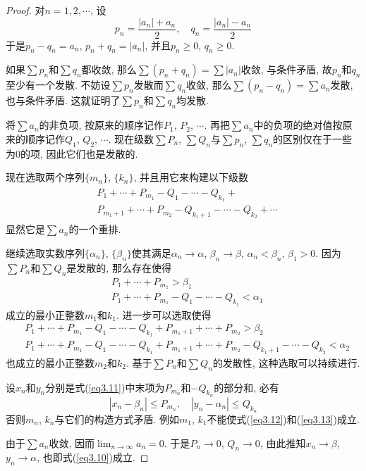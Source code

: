 \documentclass[cn,12pt,math=mtpro2,citestyle=gb7714-2015,bibstyle=gb7714-2015,twocol]{elegantbook}
\newcommand{\limn}{\lim_{n\to\infty}}
\begin{document}
\begin{proof}
  对$n=1,2,\cdots$, 设
  $$p_n=\frac{|a_n|+a_n}{2},\quad q_n=\frac{|a_n|-a_n}{2}$$
  于是$p_n-q_n=a_n$, $p_n+q_n=|a_n|$, 并且$p_n\geq 0$, $q_n\geq 0$.

  如果$\sum p_n$和$\sum q_n$都收敛, 那么$\sum (p_n+q_n)=\sum|a_n|$收敛, 与条件矛盾, 故$p_n$和$q_n$至少有一个发散. 不妨设$\sum p_n$发散而$\sum q_n$收敛, 那么$\sum (p_n-q_n)=\sum a_n$发散, 也与条件矛盾. 这就证明了$\sum p_n$和$\sum q_n$均发散.

  将$\sum a_n$的非负项, 按原来的顺序记作$P_1$, $P_2$, $\cdots$. 再把$\sum a_n$中的负项的绝对值按原来的顺序记作$Q_1$, $Q_2$, $\cdots$. 现在级数$\sum P_n$, $\sum Q_n$与$\sum p_n$, $\sum q_n$的区别仅在于一些为0的项, 因此它们也是发散的.

  现在选取两个序列$\{m_n\}$, $\{k_n\}$, 并且用它来构建以下级数
  \begin{align}\label{eq3.11}
  \begin{split}
    &P_1+\cdots+P_{m_1}-Q_1-\cdots-Q_{k_1}+ \\
    &P_{m_1+1}+\cdots+P_{m_2}-Q_{k_1+1}-\cdots-Q_{k_2}+\cdots
    \end{split}
  \end{align}
  显然它是$\sum a_n$的一个重排.

  继续选取实数序列$\{\alpha_n\}$, $\{\beta_n\}$使其满足$\alpha_n\rightarrow\alpha$, $\beta_n\rightarrow\beta$, $\alpha_n<\beta_n$, $\beta_1>0$. 因为$\sum P_n$和$\sum Q_n$是发散的, 那么存在使得
  \begin{align}
  &P_1+\cdots+P_{m_1}>\beta_1  \label{eq3.12} \\
  &P_1+\cdots+P_{m_1}-Q_1-\cdots-Q_{k_1}<\alpha_1 \label{eq3.13}
  \end{align}
  成立的最小正整数$m_1$和$k_1$. 进一步可以选取使得
  \begin{align*}
  &P_1+\cdots+P_{m_1}-Q_1-\cdots-Q_{k_1}+P_{m_1+1}+\cdots+P_{m_2}>\beta_2 \\
  &P_1+\cdots+P_{m_1}-Q_1-\cdots-Q_{k_1}+P_{m_1+1}+\cdots+P_{m_2}-Q_{k_1+1}-\cdots-Q_{k_2}<\alpha_2
  \end{align*}
  也成立的最小正整数$m_2$和$k_2$. 基于$\sum P_n$和$\sum Q_n$的发散性, 这种选取可以持续进行.

  设$x_n$和$y_n$分别是式(\ref{eq3.11})中末项为$P_{m_n}$和$-Q_{k_n}$的部分和, 必有
  $$|x_n-\beta_n|\leq P_{m_n},\quad |y_n-\alpha_n|\leq Q_{k_n}$$
  否则$m_n$, $k_n$与它们的构造方式矛盾. 例如$m_1$, $k_1$不能使式(\ref{eq3.12})和(\ref{eq3.13})成立.

  由于$\sum a_n$收敛, 因而$\displaystyle \limn  a_n=0$. 于是$P_n\rightarrow 0$, $Q_n\rightarrow 0$, 由此推知$x_n\rightarrow\beta$, $y_n\rightarrow\alpha$, 也即式(\ref{eq3.10})成立.


\end{proof}
\end{document}
